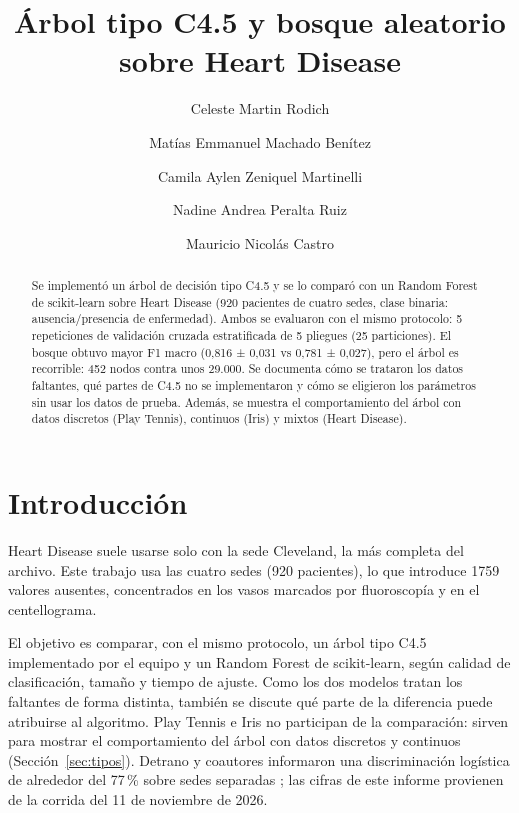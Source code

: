 \documentclass{llncs}
\begin{document}
\title{Árbol tipo C4.5 y bosque aleatorio sobre Heart Disease}
\author{Celeste Martin Rodich \and
Matías Emmanuel Machado Benítez \and
Camila Aylen Zeniquel Martinelli \and
Nadine Andrea Peralta Ruiz \and
Mauricio Nicolás Castro}
\maketitle

\begin{abstract}
Se implementó un árbol de decisión tipo C4.5 y se lo comparó con un Random Forest de scikit-learn sobre Heart Disease (920 pacientes de cuatro sedes, clase binaria: ausencia/presencia de enfermedad). Ambos se evaluaron con el mismo protocolo: 5 repeticiones de validación cruzada estratificada de 5 pliegues (25 particiones). El bosque obtuvo mayor F1 macro (0,816 ± 0,031 vs 0,781 ± 0,027), pero el árbol es recorrible: 452 nodos contra unos 29.000. Se documenta cómo se trataron los datos faltantes, qué partes de C4.5 no se implementaron y cómo se eligieron los parámetros sin usar los datos de prueba. Además, se muestra el comportamiento del árbol con datos discretos (Play Tennis), continuos (Iris) y mixtos (Heart Disease).
\end{abstract}

\section{Introducción}
\label{sec:intro}

Heart Disease suele usarse solo con la sede Cleveland, la más completa del archivo. Este trabajo usa las cuatro sedes (920 pacientes), lo que introduce 1759 valores ausentes, concentrados en los vasos marcados por fluoroscopía y en el centellograma.

El objetivo es comparar, con el mismo protocolo, un árbol tipo C4.5 implementado por el equipo y un Random Forest de scikit-learn, según calidad de clasificación, tamaño y tiempo de ajuste. Como los dos modelos tratan los faltantes de forma distinta, también se discute qué parte de la diferencia puede atribuirse al algoritmo. Play Tennis e Iris no participan de la comparación: sirven para mostrar el comportamiento del árbol con datos discretos y continuos (Sección~\ref{sec:tipos}). Detrano y coautores informaron una discriminación logística de alrededor del 77\,\% sobre sedes separadas \cite{detrano1989}; las cifras de este informe provienen de la corrida del 11 de noviembre de 2026.
\end{document}
